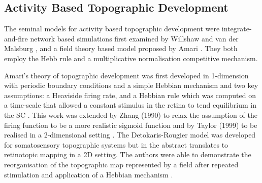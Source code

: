 \subsection{Activity Based Topographic Development}
The seminal models for activity based topographic development were integrate-and-fire network based simulations first examined by Willshaw and van der Malsburg \cite{Willshaw1976-ew}, and a field theory based model proposed by Amari \cite{Amari1977-gc}. They both employ the Hebb rule and a multiplicative normalisation competitive mechanism.

Amari's theory of topographic development was first developed in 1-dimension with periodic boundary conditions and a simple Hebbian mechanism and two key assumptions: a Heaviside firing rate, and a Hebbian rule which was computed on a time-scale that allowed a constant stimulus in the retina to tend equilibrium in the SC \cite{Takeuchi1979-zy}. This work was extended by Zhang (1990) to relax the assumption of the firing function to be a more realistic sigmoid function and by Taylor (1999) to be realised in a 2-dimensional setting \cite{Zhang1990-ve, Taylor1999-mv}. The Detokaris-Rougier model was developed for somatosensory topographic systems but in the abstract translates to retinotopic mapping in a 2D setting. The authors were able to demonstrate the reorganisation of the topographic map represented by a field after repeated stimulation and application of a Hebbian mechanism \cite{Detorakis2012-eh}.

